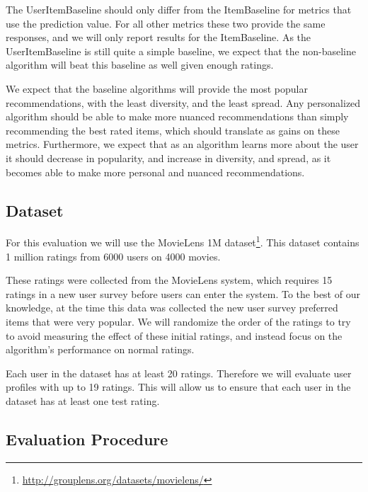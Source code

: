 \documentclass[letterpaper]{sig-alternate}
\begin{document}
  The UserItemBaseline should only differ from the ItemBaseline for metrics that use the prediction value.
  For all other metrics these two provide the same responses, and we will only report results for the ItemBaseline.
  As the UserItemBaseline is still quite a simple baseline, we expect that the non-baseline algorithm will beat this baseline as well given enough ratings.
  
  We expect that the baseline algorithms will provide the most popular recommendations, with the least diversity, and the least spread.
  Any personalized algorithm should be able to make more nuanced recommendations than simply recommending the best rated items, which should translate as gains on these metrics.
  Furthermore, we expect that as an algorithm learns more about the user it should decrease in popularity, and increase in diversity, and spread, as it becomes able to make more personal and nuanced recommendations.


  \subsection*{Dataset}

  For this evaluation we will use the MovieLens 1M dataset\footnote{\url{http://grouplens.org/datasets/movielens/}}.
  This dataset contains 1 million ratings from 6000 users on 4000 movies.
  
  These ratings were collected from the MovieLens system, which requires 15 ratings in a new user survey before users can enter the system.
  To the best of our knowledge, at the time this data was collected the new user survey preferred items that were very popular.
  We will randomize the order of the ratings to try to avoid measuring the effect of these initial ratings, and instead focus on the algorithm's performance on normal ratings.
  
  Each user in the dataset has at least 20 ratings.
  Therefore we will evaluate user profiles with up to 19 ratings.
  This will allow us to ensure that each user in the dataset has at least one test rating.

  
  \subsection*{Evaluation Procedure}
\end{document}
